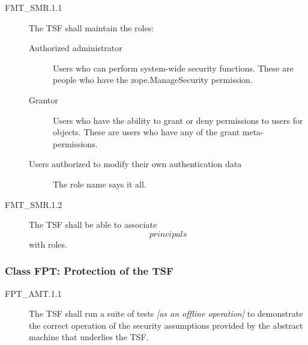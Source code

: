 \documentclass[12pt,english]{scrbook}
\begin{document}
\begin{description}
    \item[FMT{\_}SMR.1.1]

    The TSF shall maintain the roles:
\begin{description}
\item[Authorized administrator]

Users who can perform system-wide security functions. These are
people who have the zope.ManageSecurity permission.

\item[Grantor ]

Users who have the ability to grant or deny permissions to
users for objects.  These are users who have any of the grant
meta-permissions.

\item[Users authorized to modify their own authentication data]

The role name says it all.

\end{description}

\item[FMT{\_}SMR.1.2]

The TSF shall be able to associate \emph{\[principals\]} with roles.

\end{description}





\subsubsection{Class FPT: Protection of the TSF}





\begin{description}
\item[FPT{\_}AMT.1.1 ]

The TSF shall run a suite of tests \emph{{[}as an offline
operation]} to demonstrate the correct operation of the security
assumptions provided by the abstract machine that underlies the
TSF.

\end{description}
\end{document}

